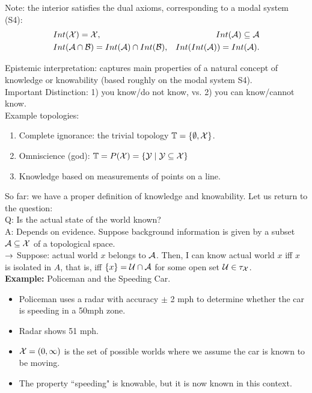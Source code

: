 Note: the interior satisfies the dual axioms, corresponding to a modal system (S4):
\begin{align}
    &Int(\mathcal{X}) = \mathcal{X}, &Int(\mathcal{A}) \subseteq \mathcal{A} \\
    &Int(\mathcal{A} \cap \mathcal{B}) = Int(\mathcal{A}) \cap Int(\mathcal{B}), &Int(Int(\mathcal{A})) = Int(\mathcal{A}).
\end{align}

Epistemic interpretation: captures main properties of a natural concept of knowledge or knowability (based roughly on the modal system S4). \\


Important Distinction: 1) you know/do not know, vs. 2) you can know/cannot know. \\

Example topologies:
\begin{enumerate}
    \item Complete ignorance: the trivial topology $\mathbb{T} = \{\emptyset, \mathcal{X}\}$.
    \item Omniscience (god): $\mathbb{T} = P(\mathcal{X}) = \{\mathcal{Y} \mid \mathcal{Y} \subseteq \mathcal{X}\}$
    \item Knowledge based on measurements of points on a line.
\end{enumerate}

So far: we have a proper definition of knowledge and knowability. Let us return to the question: \\

Q: Is the actual state of the world known? \\

A: Depends on evidence. Suppose background information is given by a subset $\mathcal{A} \subseteq \mathcal{X}$ of a topological space. \\

$\rightarrow$ Suppose: actual world $x$ belongs to $\mathcal{A}$. Then, I can know actual world $x$ iff $x$ is isolated in $A$, that is, iff $\{x\} = \mathcal{U} \cap \mathcal{A}$ for some open set $\mathcal{U} \in \tau_{\mathcal{X}}$.\\

{\bf Example:} Policeman and the Speeding Car.
\begin{itemize}
    \item Policeman uses a radar with accuracy $\pm$ 2 mph to determine whether the car is speeding in a 50mph zone.
    \item Radar shows 51 mph.
    \item $\mathcal{X} = (0, \infty)$ is the set of possible worlds where we assume the car is known to be moving.
    \item The property ``speeding" is knowable, but it is now known in this context.
\end{itemize}

